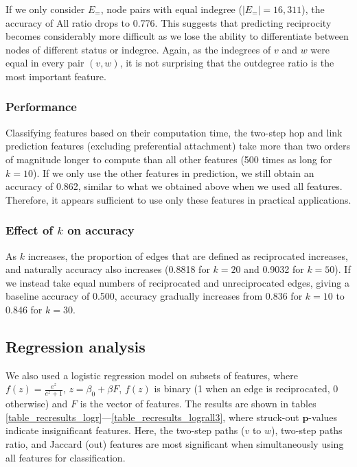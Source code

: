 \documentclass[conference]{IEEEtran}
\begin{document}
If we only consider $E_=$, node pairs with equal indegree ($|E_=|=16,311$), the accuracy of All ratio drops to 0.776.
This suggests that predicting reciprocity becomes considerably more difficult as we lose the ability to differentiate between nodes of different status or indegree. 
Again, as the indegrees of $v$ and $w$ were equal in every pair $(v,w)$, it is not surprising that the outdegree ratio is the most important feature.

\subsubsection{Performance}
Classifying features based on their computation time, the two-step hop and
link prediction features (excluding preferential attachment) take more
than two orders of magnitude longer to compute than all other features
(500 times as long for $k=10$).  If we only use the other features in
prediction, we still obtain an accuracy of 0.862, similar to what we
obtained above when we used all features.  Therefore, it appears
sufficient to use only these features in practical applications.

\subsubsection{Effect of $k$ on accuracy}
As $k$ increases, the proportion of edges that are defined as reciprocated increases, and naturally accuracy also increases (0.8818 for $k=20$ and 0.9032 for $k=50$).
If we instead take equal numbers of reciprocated and unreciprocated edges, giving a baseline accuracy of 0.500, accuracy gradually increases from 0.836 for $k=10$ to 0.846 for $k=30$.

\subsection{Regression analysis}
We also used a logistic regression model on subsets of features, where $f(z) = \frac{e^z}{e^z+1}$, $z = \beta_0 + \beta F$, $f(z)$ is binary (1 when an edge is reciprocated, 0 otherwise) and $F$ is the vector of features.
The results are shown in tables \ref{table_recresults_logr}---\ref{table_recresults_lograll3}, where struck-out $\mathbf{p}$-values indicate insignificant features. 
Here, the two-step paths ($v$ to $w$), two-step paths ratio, and Jaccard (out) features are most significant when simultaneously using all features for classification. 
\end{document}
